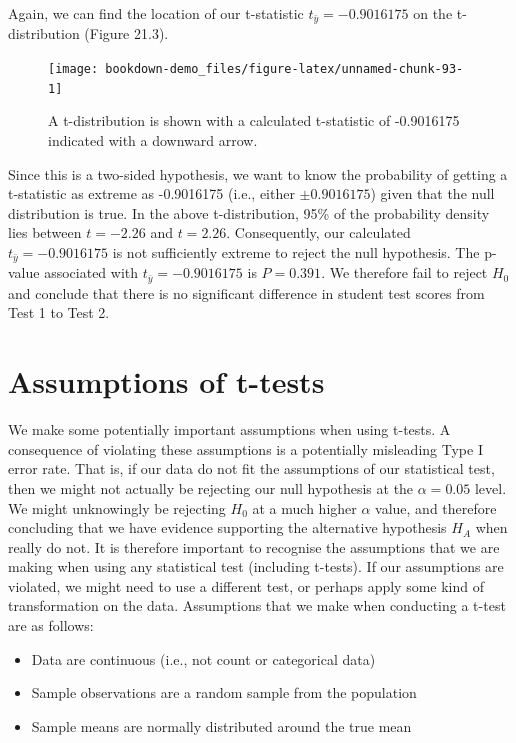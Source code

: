 \documentclass[
]{scrbook}
\providecommand{\tightlist}{%
  \setlength{\itemsep}{0pt}\setlength{\parskip}{0pt}}
\begin{document}
Again, we can find the location of our t-statistic \(t_{\bar{y}} = -0.9016175\) on the t-distribution (Figure 21.3).

\begin{figure}
\texttt{[image: bookdown-demo\_files/figure-latex/unnamed-chunk-93-1]} \caption{A t-distribution is shown with a calculated t-statistic of -0.9016175 indicated with a downward arrow.}\label{fig:unnamed-chunk-93}
\end{figure}

Since this is a two-sided hypothesis, we want to know the probability of getting a t-statistic as extreme as -0.9016175 (i.e., either \(\pm 0.9016175\)) given that the null distribution is true.
In the above t-distribution, 95\% of the probability density lies between \(t = -2.26\) and \(t = 2.26\).
Consequently, our calculated \(t_{\bar{y}} = -0.9016175\) is not sufficiently extreme to reject the null hypothesis.
The p-value associated with \(t_{\bar{y}} = -0.9016175\) is \(P = 0.391\).
We therefore fail to reject \(H_{0}\) and conclude that there is no significant difference in student test scores from Test 1 to Test 2.

\hypertarget{assumptions-of-t-tests}{%
\section{Assumptions of t-tests}\label{assumptions-of-t-tests}}

We make some potentially important assumptions when using t-tests.
A consequence of violating these assumptions is a potentially misleading Type I error rate.
That is, if our data do not fit the assumptions of our statistical test, then we might not actually be rejecting our null hypothesis at the \(\alpha = 0.05\) level.
We might unknowingly be rejecting \(H_{0}\) at a much higher \(\alpha\) value, and therefore concluding that we have evidence supporting the alternative hypothesis \(H_{A}\) when really do not.
It is therefore important to recognise the assumptions that we are making when using any statistical test (including t-tests).
If our assumptions are violated, we might need to use a different test, or perhaps apply some kind of transformation on the data.
Assumptions that we make when conducting a t-test are as follows:

\begin{itemize}
\tightlist
\item
  Data are continuous (i.e., not count or categorical data)
\item
  Sample observations are a random sample from the population
\item
  Sample means are normally distributed around the true mean
\end{itemize}
\end{document}
